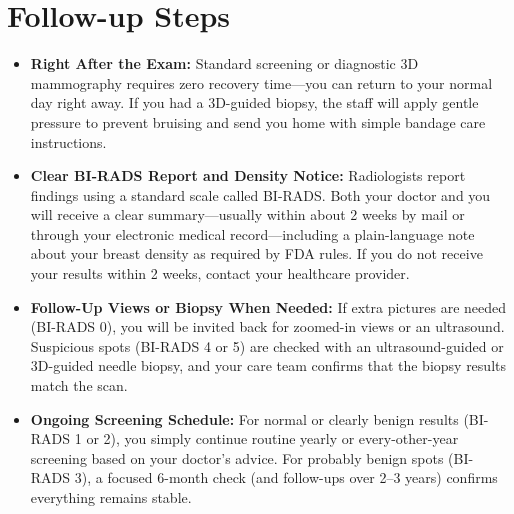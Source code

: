 \section{Follow-up Steps}
\begin{itemize}
\item \textbf{Right After the Exam:} Standard screening or diagnostic 3D mammography requires zero recovery time---you can return to your normal day right away. If you had a 3D-guided biopsy, the staff will apply gentle pressure to prevent bruising and send you home with simple bandage care instructions.
\item \textbf{Clear BI-RADS Report and Density Notice:} Radiologists report findings using a standard scale called BI-RADS. Both your doctor and you will receive a clear summary---usually within about 2 weeks by mail or through your electronic medical record---including a plain-language note about your breast density as required by FDA rules. If you do not receive your results within 2 weeks, contact your healthcare provider.
\item \textbf{Follow-Up Views or Biopsy When Needed:} If extra pictures are needed (BI-RADS 0), you will be invited back for zoomed-in views or an ultrasound. Suspicious spots (BI-RADS 4 or 5) are checked with an ultrasound-guided or 3D-guided needle biopsy, and your care team confirms that the biopsy results match the scan.
\item \textbf{Ongoing Screening Schedule:} For normal or clearly benign results (BI-RADS 1 or 2), you simply continue routine yearly or every-other-year screening based on your doctor's advice. For probably benign spots (BI-RADS 3), a focused 6-month check (and follow-ups over 2--3 years) confirms everything remains stable.
\end{itemize}

